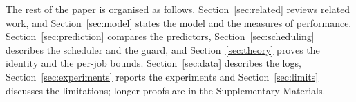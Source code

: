 The rest of the paper is organised as follows. Section~\ref{sec:related} reviews related
work, and Section~\ref{sec:model} states the model and the measures of performance.
Section~\ref{sec:prediction} compares the predictors, Section~\ref{sec:scheduling}
describes the scheduler and the guard, and Section~\ref{sec:theory} proves the identity
and the per-job bounds. Section~\ref{sec:data} describes the logs,
Section~\ref{sec:experiments} reports the experiments and Section~\ref{sec:limits}
discusses the limitations; longer proofs are in the Supplementary Materials.
